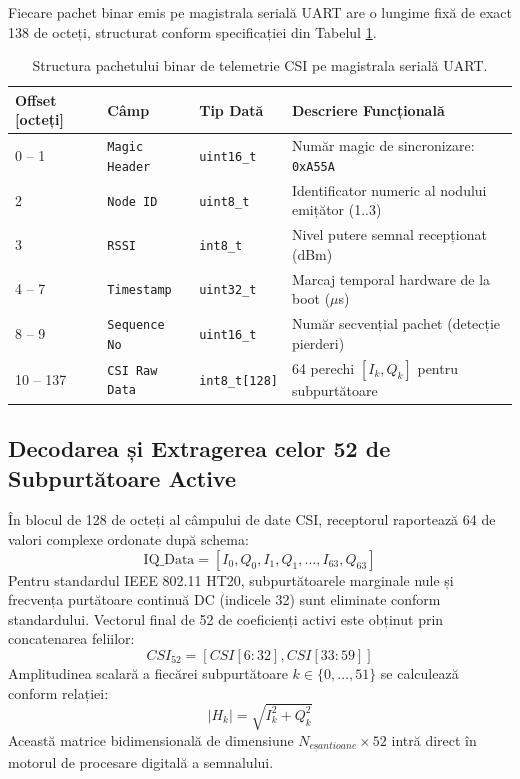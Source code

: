 Fiecare pachet binar emis pe magistrala serială UART are o lungime fixă de exact 138 de octeți, structurat conform specificației din Tabelul \ref{tab:packet_structure}.

\begin{table}[H]
\centering
\begin{tabular}{@{}llll@{}}
\toprule
\textbf{Offset [octeți]} & \textbf{Câmp} & \textbf{Tip Dată} & \textbf{Descriere Funcțională} \\ \midrule
0 -- 1 & \texttt{Magic Header} & \texttt{uint16\_t} & Număr magic de sincronizare: \texttt{0xA55A} \\
2 & \texttt{Node ID} & \texttt{uint8\_t} & Identificator numeric al nodului emițător (1..3) \\
3 & \texttt{RSSI} & \texttt{int8\_t} & Nivel putere semnal recepționat (dBm) \\
4 -- 7 & \texttt{Timestamp} & \texttt{uint32\_t} & Marcaj temporal hardware de la boot ($\mu$s) \\
8 -- 9 & \texttt{Sequence No} & \texttt{uint16\_t} & Număr secvențial pachet (detecție pierderi) \\
10 -- 137 & \texttt{CSI Raw Data} & \texttt{int8\_t[128]} & 64 perechi $[I_k, Q_k]$ pentru subpurtătoare \\ \bottomrule
\end{tabular}
\caption{Structura pachetului binar de telemetrie CSI pe magistrala serială UART.}
\label{tab:packet_structure}
\end{table}

\subsection{Decodarea și Extragerea celor 52 de Subpurtătoare Active}
În blocul de 128 de octeți al câmpului de date CSI, receptorul raportează 64 de valori complexe ordonate după schema:
\begin{equation}
    \text{IQ\_Data} = [I_0, Q_0, I_1, Q_1, \dots, I_{63}, Q_{63}]
\end{equation}
Pentru standardul IEEE 802.11 HT20, subpurtătoarele marginale nule și frecvența purtătoare continuă DC (indicele 32) sunt eliminate conform standardului. Vectorul final de 52 de coeficienți activi este obținut prin concatenarea feliilor:
\begin{equation}
    CSI_{52} = [CSI[6:32], CSI[33:59]]
\end{equation}
Amplitudinea scalară a fiecărei subpurtătoare $k \in \{0, \dots, 51\}$ se calculează conform relației:
\begin{equation}
    |H_k| = \sqrt{I_k^2 + Q_k^2}
\end{equation}
Această matrice bidimensională de dimensiune $N_{eșantioane} \times 52$ intră direct în motorul de procesare digitală a semnalului.
